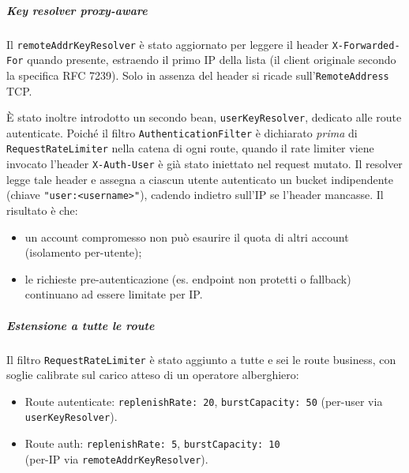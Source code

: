 ﻿\documentclass[a4paper,12pt]{report}
\begin{document}
\subparagraph{Key resolver proxy-aware}
Il \texttt{remoteAddrKeyResolver} è stato aggiornato per leggere il header
\texttt{X-Forwarded-For} quando presente, estraendo il primo IP della lista
(il client originale secondo la specifica RFC 7239).  Solo in assenza del header
si ricade sull'\texttt{RemoteAddress} TCP.

È stato inoltre introdotto un secondo bean, \texttt{userKeyResolver}, dedicato alle
route autenticate.  Poiché il filtro \texttt{AuthenticationFilter} è dichiarato
\emph{prima} di \texttt{RequestRateLimiter} nella catena di ogni route, quando il rate
limiter viene invocato l'header \texttt{X-Auth-User} è già stato iniettato nel request
mutato.  Il resolver legge tale header e assegna a ciascun utente autenticato un bucket
indipendente (chiave \texttt{"user:<username>"}), cadendo indietro sull'IP se l'header
mancasse.  Il risultato è che:
\begin{itemize}
  \item un account compromesso non può esaurire il quota di altri account (isolamento
        per-utente);
  \item le richieste pre-autenticazione (es. endpoint non protetti o fallback) continuano
        ad essere limitate per IP.
\end{itemize}

\subparagraph{Estensione a tutte le route}
Il filtro \texttt{RequestRateLimiter} è stato aggiunto a tutte e sei le route business,
con soglie calibrate sul carico atteso di un operatore alberghiero:
\begin{itemize}
  \item Route autenticate: \texttt{replenishRate: 20}, \texttt{burstCapacity: 50}
        (per-user via \texttt{userKeyResolver}).
  \item Route auth: \texttt{replenishRate: 5}, \texttt{burstCapacity: 10}\\
        (per-IP via \texttt{remote\-Addr\-Key\-Resolver}).
\end{itemize}
\end{document}
